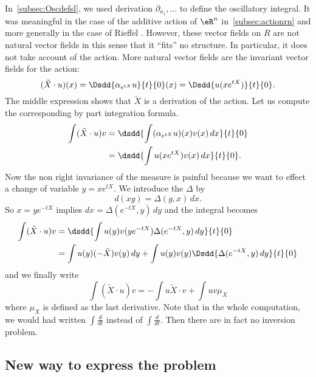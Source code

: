 In~\ref{subsec:Oscdefsl}, we used derivation $\partial_{a_1},\ldots$ to define the oscillatory integral. It was meaningful in the case of the additive action of $\eR^n$ in~\ref{subsec:actionrn} and more generally in the case of Rieffel \cite{Rieffel}. However, these vector fields on $R$ are not natural vector fields in this sense that it ``fits'' no structure. In particular, it does not take account of the action. More natural vector fields are the invariant vector fields for the action:
\begin{equation}
	(\tilde X\cdot u)(x)=\Dsdd{ \alpha_{e^{tX}}u }{t}{0}(x)=\Dsdd{ u(xe^{tX}) }{t}{0}.
\end{equation}
The middle expression shows that $\tilde X$ is a derivation of the action. Let us compute the corresponding by part integration formula.
\begin{equation}
	\begin{split}
		\int (\tilde X\cdot u)v&=\dsdd{\int (\alpha_{e^{tX}}u)(x)v(x)\,dx }{t}{0}\\
		&=\dsdd{ \int u(xe^{tX})v(x)\,dx }{t}{0}.
	\end{split}
\end{equation}
Now the non right invariance of the measure is painful because we want to effect a change of variable $y=xe^{tX}$. We introduce the  $\Delta$ by
\begin{equation}
	d(xg)=\Delta(g,x)\,dx.
\end{equation}
So $x=ye^{-tX}$ implies $dx=\Delta(e^{-tX},y)\,dy$ and the integral becomes
\begin{equation} \label{eq:euler}
	\begin{split}
		\int (\tilde X\cdot u)v&=\dsdd{ \int u(y)v(ye^{-tX})\Delta(e^{-tX},y)\,dy }{t}{0}\\
		&=\int u(y)(-\tilde X)v(y)\,dy+\int u(y) v(y)\Dsdd{ \Delta(e^{-tX},y)\,dy }{t}{0}
	\end{split}
\end{equation}
and we finally write
\begin{equation}
	\int (\tilde X\cdot u)v=-\int u\tilde X\cdot v+\int uv\mu_X
\end{equation}
where $\mu_X$ is defined as the last derivative. Note that in the whole computation, we would had written $\int\frac{d}{dt}$ instead of $\int\frac{d}{dt}$. Then there are in fact no inversion problem.


\subsection{New way to express the problem}

